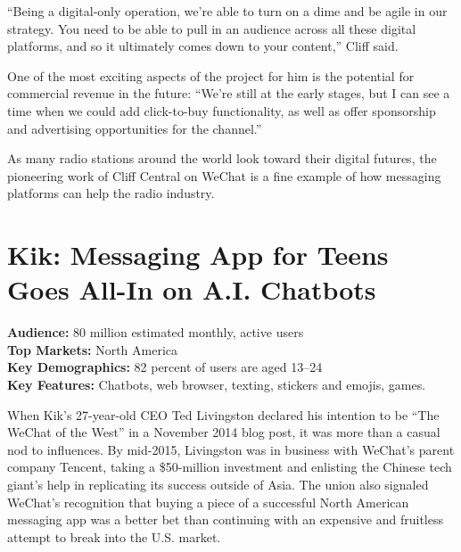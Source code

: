 \documentclass[notoc, symmetric, nobib, nols]{towcenter-guideto-book}
\begin{document}


``Being a digital-only operation, we're able to turn on a dime and be agile in our strategy. You need to be able to pull in an audience across all these digital platforms, and so it ultimately comes down to your content,'' Cliff said.

One of the most exciting aspects of the project for him is the potential for commercial revenue in the future: ``We're still at the early stages, but I can see a time when we could add click-to-buy functionality, as well as offer sponsorship and advertising opportunities for the channel.''

As many radio stations around the world look toward their digital futures, the pioneering work of Cliff Central on WeChat is a fine example of how messaging platforms can help the radio industry.

\section[Kik: Messaging App for Teens Goes All-In on A.I. Chatbots]{Kik: Messaging App for Teens Goes All-In \protect\newline on A.I. Chatbots}
\begin{framed}
\noindent\textbf{Audience:} 80 million estimated monthly, active users \\
\noindent\textbf{Top Markets:} North America \\
\noindent\textbf{Key Demographics:} 82 percent of users are aged 13--24\\
\noindent\textbf{Key Features:} Chatbots, web browser, texting, stickers and emojis, games.
\end{framed}

When Kik's 27-year-old CEO Ted Livingston declared his intention to be ``The WeChat of the West'' in a November 2014 blog post,\autocite{MediumKik} it was more than a casual nod to influences. By mid-2015, Livingston was in business with WeChat's parent company Tencent, taking a \$50-million investment and enlisting the Chinese tech giant's help in replicating its success outside of Asia. The union also signaled WeChat's recognition that buying a piece of a successful North American messaging app was a better bet than continuing with an expensive and fruitless attempt to break into the U.S. market.
\end{document}

